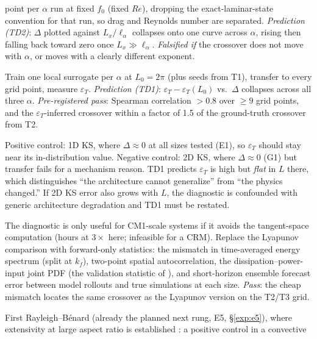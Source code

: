 \documentclass[11pt]{article}
\begin{document}
\begin{description}[style=nextline,leftmargin=1.2em]
  point per $\alpha$ run at fixed $f_0$ (fixed $Re$), dropping the
  exact-laminar-state convention for that run, so drag and Reynolds
  number are separated. \emph{Prediction (TD2)}: $\Delta$
  plotted against $L_x/\ell_\alpha$ collapses onto one curve across
  $\alpha$, rising then falling back toward zero once $L_x\gg\ell_\alpha$.
  \emph{Falsified if} the crossover does not move with $\alpha$, or moves
  with a clearly different exponent.
\item[T3 --- Transfer error on the same grid.] \label{exp:t3}
  Train one local surrogate per $\alpha$ at $L_0=2\pi$ (plus seeds from
  T1), transfer to every grid point, measure $\varepsilon_T$.
  \emph{Prediction (TD1)}: $\varepsilon_T-\varepsilon_T(L_0)$ vs.\ $\Delta$
  collapses across all three $\alpha$. \emph{Pre-registered pass}:
  Spearman correlation $>0.8$ over $\geq9$ grid points, and the
  $\varepsilon_T$-inferred crossover within a factor of 1.5 of the
  ground-truth crossover from T2.
\item[T4 --- Controls that separate diagnostic from coincidence.] \label{exp:t4}
  Positive control: 1D KS, where $\Delta\approx0$ at all sizes tested
  (E1), so $\varepsilon_T$ should stay near its in-distribution value.
  Negative control: 2D KS, where $\Delta\approx0$ (G1) but transfer fails
  for a mechanism reason. TD1 predicts $\varepsilon_T$ is high but
  \emph{flat} in $L$ there, which distinguishes ``the architecture
  cannot generalize'' from ``the physics changed.'' If 2D KS error also
  grows with $L$, the diagnostic is confounded with generic architecture
  degradation and TD1 must be restated.
\item[T5 --- A cheap version of $\varepsilon_T$.] \label{exp:t5}
  The diagnostic is only useful for CM1-scale systems if it avoids the
  tangent-space computation (hours at $3\times$ here; infeasible for a
  CRM). Replace the Lyapunov comparison with forward-only statistics: the
  mismatch in time-averaged energy spectrum (split at $k_f$), two-point
  spatial autocorrelation, the dissipation--power-input joint PDF (the
  validation statistic of \cite{constanteamores2024}), and short-horizon
  ensemble forecast error between model rollouts and true simulations at
  each size. \emph{Pass}: the cheap mismatch locates
  the same crossover as the Lyapunov version on the T2/T3 grid.
\item[T6 --- Convection.] \label{exp:t6}
  First Rayleigh--B\'enard (already the planned next rung, E5,
  \S\ref{exp:e5}), where extensivity at large aspect ratio is established
  \cite{paul2007,karimipaul2010}: a positive control in a convective

\end{description}
\end{document}
